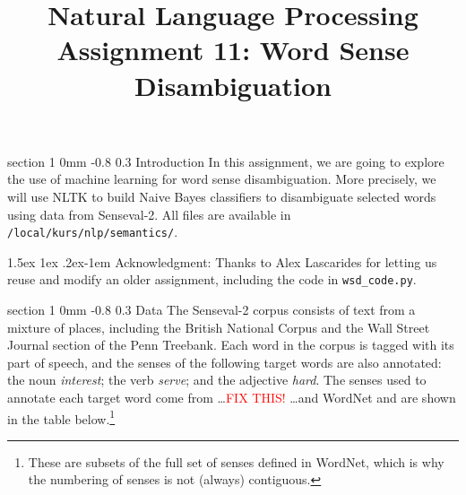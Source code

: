 \documentclass[11pt]{article}
\title{{\LARGE Natural Language Processing}\\[1.5mm]{\large Assignment 11: Word Sense Disambiguation}}
\author{}
\date{} %
\makeatletter
\newcommand{\newsec}[2]{\section{#1}\label{sec:#2}\noindent}
\renewcommand{\section}{\@startsection
{section}%
{1}%
{0mm}%
{-0.8\baselineskip}%
{0.3\baselineskip}%
{\bfseries\large}}%
\renewcommand{\paragraph}{%
  \@startsection{paragraph}{4}%
  {\z@}{1.5ex \@plus 1ex \@minus .2ex}{-1em}%
  {\normalfont\normalsize\bfseries}%
}\makeatother
\makeatother
\begin{document}
 

\maketitle
\vspace{-2mm}
\newsec{Introduction}{intro}%
In this assignment, we are going to explore the use of machine learning for word sense disambiguation.
More precisely, we will use NLTK to build Naive Bayes classifiers to disambiguate selected words
using data from Senseval-2. All files are available in {\tt /local/kurs/nlp/semantics/}.

\paragraph{Acknowledgment:} Thanks to Alex Lascarides for letting us reuse
and modify an older assignment, including the code in {\tt wsd\_code.py}.

\newsec{Data}{data}%
The Senseval-2 corpus consists of text from a mixture of places, including the British National Corpus and the Wall Street Journal section of the Penn Treebank. Each word in the corpus is tagged with its part of speech, and the senses of the following target words are also annotated: the noun {\em interest}; the verb {\em serve}; and the adjective {\em hard}. The senses used to annotate each target word come from \ldots \textcolor{red}{FIX THIS!} \ldots and WordNet and are shown in the table below.\footnote{These are subsets of the full set of senses defined in WordNet,
which is why the numbering of senses is not (always) contiguous.}
\end{document}
